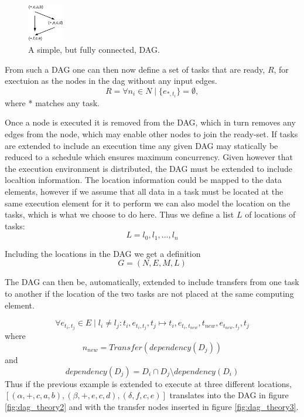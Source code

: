 \documentclass{acm_proc_article-sp}
\begin{document}
\begin{figure}
 \centering
 \includegraphics[width=60px]{gfx/dag_theory1}
 \caption{A simple, but fully connected, DAG.}
 \label{fig:dag_theory1}
\end{figure}


From such a DAG one can then now define a set of tasks that are ready, $R$, for exectuion as the nodes in the dag without any input edges.
\begin{equation*}
R = \forall n_i \in N \mid \{e_{*,t_i}\} = \emptyset,
\end{equation*}
where * matches any task.

Once a node is executed it is removed from the DAG, which in turn removes any edges from the node, which may enable other nodes to join the ready-set. If tasks are extended to include an execution time any given DAG may statically be reduced to a schedule which ensures maximum concurrency. Given however that the execution environment is distributed, the DAG must be extended to include localtion information. The location information could be mapped to the data elements, however if we assume that all data in a task must be located at the same execution element for it to perform we can also model the location on the tasks, which is what we choose to do here. Thus we define a list $L$ of locations of tasks:
\begin{equation*}
L={l_0,l_1,...,l_n}
\end{equation*}

Including the locations in the DAG we get a definition
\begin{equation*}
G=(N,E,M,L)
\end{equation*}


The DAG can then be, automatically, extended to include transfers from one task to another if the location of the two tasks are not placed at the same computing element.

\begin{equation*}
\forall e_{t_i,t_j} \in E \mid l_i \neq l_j : t_i,e_{t_i,t_j},t_j \mapsto t_i,e_{t_i,t_{new}},t_{new},e_{t_{new},t_j},t_j
\end{equation*}
where
\begin{equation*}
n_{new} = Transfer(dependency(D_j))
\end{equation*}
and
\begin{equation*}
dependency(D_j) = D_i \cap D_j \setminus dependency(D_i)
\end{equation*}
Thus if the previous example is extended to execute at three different locations, $[(\alpha,+,c,a,b),(\beta,+,e,c,d),(\delta, f,c,e)]$ translates into the DAG in figure \ref{fig:dag_theory2} and with the transfer nodes inserted in figure \ref{fig:dag_theory3}.
\end{document}
